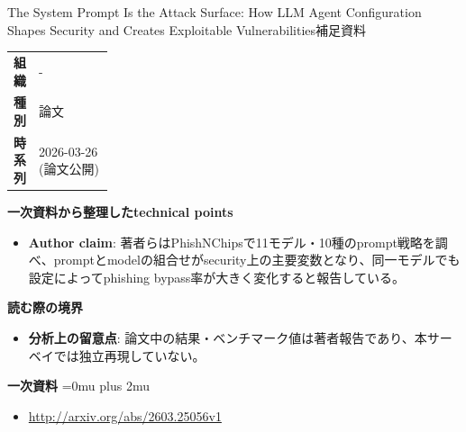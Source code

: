 \begin{technicalnote}{The System Prompt Is the Attack Surface: How LLM Agent Configuration Shapes Security and Creates Exploitable Vulnerabilities}{補足資料}
\begingroup
\begin{tabularx}{\linewidth}{@{}>{\bfseries}p{0.22\linewidth}X@{}}
組織 & - \\
種別 & 論文 \\
時系列 & 2026-03-26 (論文公開) \\
\end{tabularx}
\smallskip
{\bfseries 一次資料から整理したtechnical points}
\begin{itemize}[leftmargin=1.5em,itemsep=0.35em]
\item \textbf{Author claim}: 著者らはPhishNChipsで11モデル・10種のprompt戦略を調べ、promptとmodelの組合せがsecurity上の主要変数となり、同一モデルでも設定によってphishing bypass率が大きく変化すると報告している。
\end{itemize}
\begin{minipage}{\linewidth}
{\bfseries 読む際の境界}
\begin{itemize}[leftmargin=1.5em,itemsep=0.35em]
\item \textbf{分析上の留意点}: 論文中の結果・ベンチマーク値は著者報告であり、本サーベイでは独立再現していない。
\end{itemize}
\begin{samepage}
{\bfseries 一次資料}
\begingroup\sloppy
\Urlmuskip=0mu plus 2mu\relax
\begin{itemize}[leftmargin=1.5em,itemsep=0.25em]
\item {\scriptsize\url{http://arxiv.org/abs/2603.25056v1}}
\end{itemize}
\endgroup
\end{samepage}
\end{minipage}
\endgroup
\end{technicalnote}
\medskip

